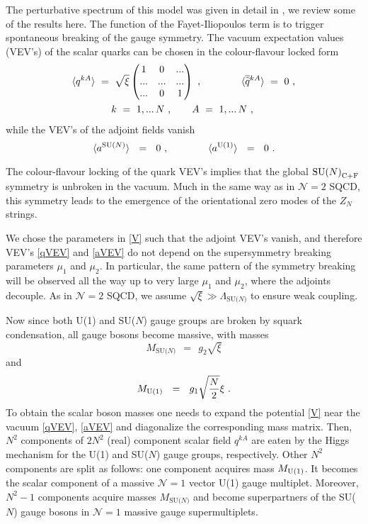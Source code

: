 \documentclass[12pt]{article}
\def\beq{\begin{equation}}
\def\eeq{\end{equation}}
\newcommand{\ntwo}{${\mathcal N}=2$ }
\newcommand{\none}{${\mathcal N}=1$ }
\newcommand{\wt}{\widetilde}
\newcommand{\ov}{\overline}
\newcommand{\LN}{\Lambda_\text{SU($N$)}}
\def\cfl {$\text{SU($N$)}_{\rm C+F}$ }
\newcommand{\aU}{a^{\rm U(1)}}
\newcommand{\aN}{a^\text{SU($N$)}}
\newcommand{\MN}{M_\text{SU($N$)}}
\newcommand{\MU}{M_{\rm U(1)}}
\begin{document}
	The perturbative spectrum of this model was given in detail in \cite{SYrev},
	we review some of the results here. 
	The function of the Fayet-Iliopoulos term is to trigger spontaneous breaking of the gauge 
	symmetry.
	The vacuum expectation values (VEV's) of the scalar quarks can be chosen in the 
	colour-flavour locked form
\begin{align}
%
\notag
&
	\langle q^{kA} \rangle ~=~ \sqrt{\xi} 
		\begin{pmatrix}
			 1  &   0  &  ... \\
			... &  ... &  ... \\
			... &   0  &  1 
		\end{pmatrix} ~,
	\qquad\qquad 
	\langle \ov{\wt{q}}{}^{kA} \rangle ~=~ 0~,
	\\
%
\label{qVEV}
&
	\qquad\qquad  k~=~ 1,...\, N~, \qquad  A ~=~ 1,...\, N~,
\end{align}
	while the VEV's of the adjoint fields vanish
\beq
\label{aVEV}
	\langle \aN \rangle  ~~=~~ 0~, \qquad\qquad  \langle \aU \rangle ~~=~~ 0~.
\eeq

	The colour-flavour locking of the quark VEV's implies that the global \cfl 
	symmetry is unbroken in the vacuum.
	Much in the same way as in \ntwo SQCD, this symmetry leads to the emergence of the orientational
	zero modes of the $ Z_N $ strings.

	We chose the parameters in \eqref{V} such that the adjoint VEV's vanish, 
	and therefore VEV's \eqref{qVEV} and \eqref{aVEV} do not depend on the supersymmetry breaking
	parameters $ \mu_1 $ and $ \mu_2 $.
	In particular, the same pattern of the symmetry breaking will be observed all the way up to
	very large $ \mu_1 $ and $ \mu_2 $, where the adjoints decouple.
	As in \ntwo SQCD, we assume $ \sqrt{\xi} \gg \LN $ to ensure weak coupling.

	Now since both U(1) and SU($N$) gauge groups are broken by squark condensation, all gauge bosons
	become massive, with masses 
\beq
\label{MN}
	\MN ~~=~~ g_2\sqrt{\xi}
\eeq
	and
\beq
\label{MU}
	\MU ~~=~~ g_1 \sqrt{\frac{N}{2}} \xi~.
\eeq
	To obtain the scalar boson masses one needs to expand the potential \eqref{V} near 
	the vacuum \eqref{qVEV}, \eqref{aVEV} and diagonalize the corresponding mass matrix.
	Then, $ N^2 $ components of $2N^2$ (real) component scalar field $ q^{kA} $ are eaten by the
	Higgs mechanism for the U(1) and SU($N$) gauge groups, respectively. 
	Other $ N^2 $ components are split as follows: one component acquires mass $ \MU $.
	It becomes the scalar component of a massive \none vector U(1) gauge multiplet.
	Moreover, $ N^2 - 1 $ components acquire masses $ \MN $ and become superpartners of the
	SU($N$) gauge bosons in \none  massive gauge supermultiplets.
	
\end{document}
